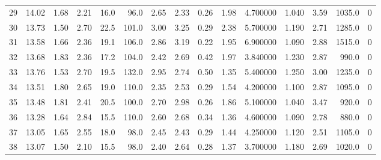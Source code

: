 \documentclass{article}
\begin{document}
\begin{tabular}{lrrrrrrrrrrrrrr}
    29  &    14.02 &        1.68 &  2.21 &               16.0 &       96.0 &           2.65 &        2.33 &                  0.26 &             1.98 &         4.700000 &  1.040 &                          3.59 &   1035.0 &      0 \\
    30  &    13.73 &        1.50 &  2.70 &               22.5 &      101.0 &           3.00 &        3.25 &                  0.29 &             2.38 &         5.700000 &  1.190 &                          2.71 &   1285.0 &      0 \\
    31  &    13.58 &        1.66 &  2.36 &               19.1 &      106.0 &           2.86 &        3.19 &                  0.22 &             1.95 &         6.900000 &  1.090 &                          2.88 &   1515.0 &      0 \\
    32  &    13.68 &        1.83 &  2.36 &               17.2 &      104.0 &           2.42 &        2.69 &                  0.42 &             1.97 &         3.840000 &  1.230 &                          2.87 &    990.0 &      0 \\
    33  &    13.76 &        1.53 &  2.70 &               19.5 &      132.0 &           2.95 &        2.74 &                  0.50 &             1.35 &         5.400000 &  1.250 &                          3.00 &   1235.0 &      0 \\
    34  &    13.51 &        1.80 &  2.65 &               19.0 &      110.0 &           2.35 &        2.53 &                  0.29 &             1.54 &         4.200000 &  1.100 &                          2.87 &   1095.0 &      0 \\
    35  &    13.48 &        1.81 &  2.41 &               20.5 &      100.0 &           2.70 &        2.98 &                  0.26 &             1.86 &         5.100000 &  1.040 &                          3.47 &    920.0 &      0 \\
    36  &    13.28 &        1.64 &  2.84 &               15.5 &      110.0 &           2.60 &        2.68 &                  0.34 &             1.36 &         4.600000 &  1.090 &                          2.78 &    880.0 &      0 \\
    37  &    13.05 &        1.65 &  2.55 &               18.0 &       98.0 &           2.45 &        2.43 &                  0.29 &             1.44 &         4.250000 &  1.120 &                          2.51 &   1105.0 &      0 \\
    38  &    13.07 &        1.50 &  2.10 &               15.5 &       98.0 &           2.40 &        2.64 &                  0.28 &             1.37 &         3.700000 &  1.180 &                          2.69 &   1020.0 &      0 \\

\end{tabular}
\end{document}
